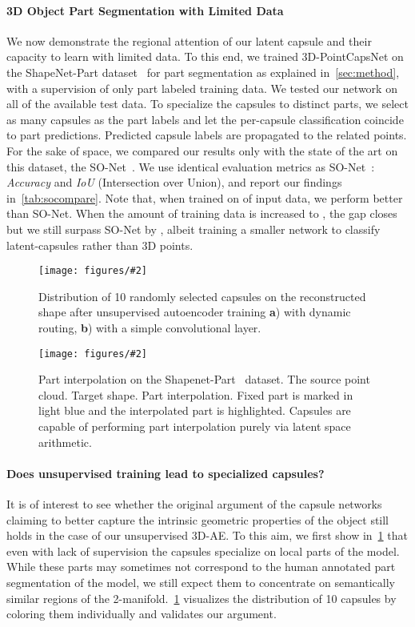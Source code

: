 \documentclass[10pt,twocolumn,letterpaper]{article}
\theoremstyle{break}
\newcommand{\insertimageC}[5]{ \begin{figure}[#5]
\centering
\texttt{[image: figures/\#2]}
\caption{#3}
\label{#4}
\end{figure}
}
\newcommand{\insertimageStar}[5]{ \begin{figure*}[#5]
\centering
\texttt{[image: figures/\#2]}
\caption{#3}
\label{#4}
\end{figure*}
}
\begin{document}
\paragraph{3D Object Part Segmentation with Limited Data}
We now demonstrate the regional attention of our latent capsule and their capacity to learn with limited data. To this end, we trained 3D-PointCapsNet on the ShapeNet-Part dataset~\cite{chang2015shapenet} for part segmentation as explained in~\cref{sec:method}, with a supervision of only  part labeled training data. We tested our network on all of the available test data. To specialize the capsules to distinct parts, we select as many capsules as the part labels and let the per-capsule classification coincide to part predictions. Predicted capsule labels are propagated to the related points. For the sake of space, we compared our results only with the state of the art on this dataset, the SO-Net~\cite{lin2018learning}. We use identical evaluation metrics as SO-Net~\cite{lin2018learning}: \textit{Accuracy} and \textit{IoU} (Intersection over Union), and report our findings in~\cref{tab:socompare}. Note that, when trained on  of input data, we perform  better than SO-Net. When the amount of training data is increased to , the gap closes but we still surpass SO-Net by , albeit training a smaller network to classify latent-capsules rather than 3D points.\vspace{-1mm}
\insertimageC{1}{conv_DR_compare_cropped.pdf}{Distribution of 10 randomly selected capsules on the reconstructed shape after unsupervised autoencoder training \textbf{a}) with dynamic routing, \textbf{b}) with a simple convolutional layer.\vspace{-3mm}}{fig:unsupcaps}{t!}\insertimageStar{.95}{part_interp_final_cropped.pdf}{Part interpolation on the Shapenet-Part~\cite{yi2016scalable} dataset.  The source point cloud.  Target shape.  Part interpolation. Fixed part is marked in light blue and the interpolated part is highlighted. Capsules are capable of performing part interpolation purely via latent space arithmetic. \vspace{-5mm}}{fig:partinterp}{t!}
\paragraph{Does unsupervised training lead to specialized capsules?}
It is of interest to see whether the original argument of the capsule networks~\cite{sabour2017dynamic,hinton2011transforming} claiming to better capture the intrinsic geometric properties of the object still holds in the case of our unsupervised 3D-AE. To this aim, we first show in~\cref{fig:unsupcaps} that even with lack of supervision the capsules specialize on local parts of the model. While these parts may sometimes not correspond to the human annotated part segmentation of the model, we still expect them to concentrate on semantically similar regions of the 2-manifold.~\cref{fig:unsupcaps} visualizes the distribution of 10 capsules by coloring them individually and validates our argument.
\end{document}
